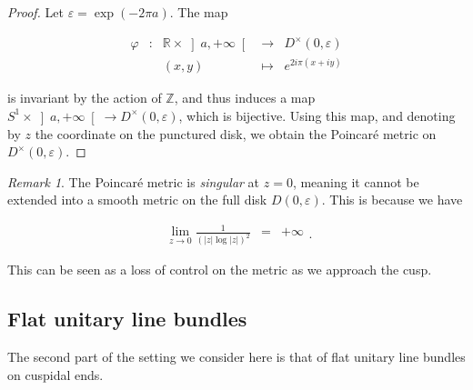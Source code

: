 \documentclass{jams-l}
\theoremstyle{definition}
\theoremstyle{remark}
\newtheorem{remark}[theorem]{Remark}
\numberwithin{equation}{section}
\begin{document}
        \begin{proof}
        
            Let $\varepsilon = \exp \left( - 2 \pi a \right)$. The map
            
            \[ \begin{array}{lllll}
                    \varphi & : & \mathbb{R} \times \left] a, +\infty \right[ & \longrightarrow & D^{\times} \left( 0, \varepsilon \right) \\[0.5em]
                    
                    && \left( x, y \right) & \longmapsto & e^{2 i \pi \left( x + iy \right)}
                \end{array} \]
            
            \noindent is invariant by the action of $\mathbb{Z}$, and thus induces a map $S^1 \times \left] a, + \infty \right[ \longrightarrow D^{\times} \left( 0, \varepsilon \right)$, which is bijective. Using this map, and denoting by $z$ the coordinate on the punctured disk, we obtain the Poincaré metric on $D^{\times} \left( 0, \varepsilon \right)$.
        
        \end{proof}
        
        \begin{remark}
        
            The Poincaré metric is \textit{singular} at $z=0$, meaning it cannot be extended into a smooth metric on the full disk $D \left( 0, \varepsilon \right)$. This is because we have
            
            \[ \begin{array}{lll}
                    \lim\limits_{z \rightarrow 0} \frac{1}{\left( \left \vert z \right \vert \log \left \vert z \right\vert \right)^2} & = & + \infty
                \end{array} . \]
            
            \noindent This can be seen as a loss of control on the metric as we approach the cusp.
        
        \end{remark}
        
        
    \subsection{Flat unitary line bundles}
    \label{SubSecFlatUnitaryLineBundles}
    
        The second part of the setting we consider here is that of flat unitary line bundles on cuspidal ends.
        
\end{document}
